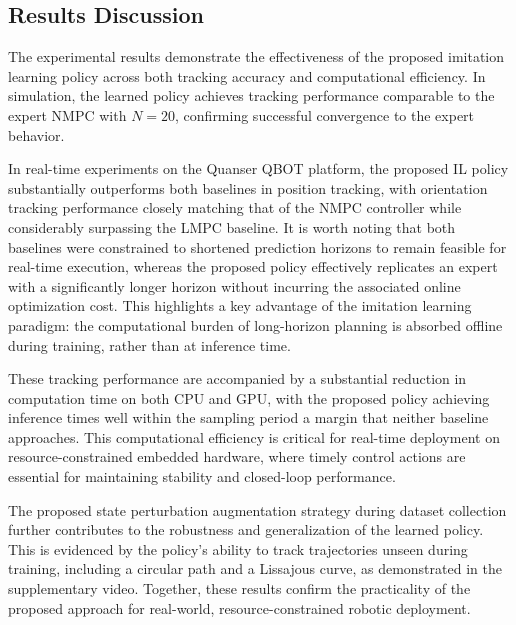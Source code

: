 \documentclass[letterpaper, 10 pt, conference]{ieeeconf}
\begin{document}

\subsection{Results Discussion}
The experimental results demonstrate the effectiveness of the proposed imitation learning policy across both tracking accuracy and computational efficiency. In simulation, the learned policy achieves tracking performance comparable to the expert NMPC with $N=20$, confirming successful convergence to the expert behavior.

In real-time experiments on the Quanser QBOT platform, the proposed IL policy substantially outperforms both baselines in position tracking, with orientation tracking performance closely matching that of the NMPC controller while considerably surpassing the LMPC baseline. It is worth noting that both baselines were constrained to shortened prediction horizons to remain feasible for real-time execution, whereas the proposed policy effectively replicates an expert with a significantly longer horizon without incurring the associated online optimization cost. This highlights a key advantage of the imitation learning paradigm: the computational burden of long-horizon planning is absorbed offline during training, rather than at inference time.

These tracking performance are accompanied by a substantial reduction in computation time on both CPU and GPU, with the proposed policy achieving inference times well within the sampling period a margin that neither baseline approaches. This computational efficiency is critical for real-time deployment on resource-constrained embedded hardware, where timely control actions are essential for maintaining stability and closed-loop performance.

The proposed state perturbation augmentation strategy during dataset collection further contributes to the robustness and generalization of the learned policy. This is evidenced by the policy's ability to track trajectories unseen during training, including a circular path and a Lissajous curve, as demonstrated in the supplementary video. Together, these results confirm the practicality of the proposed approach for real-world, resource-constrained robotic deployment.
\end{document}
